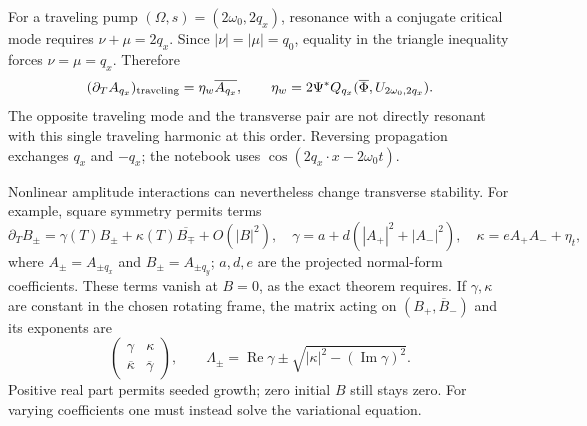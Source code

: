 \documentclass[11pt]{article}
\newcommand{\Rea}{\operatorname{Re}}
\newcommand{\Ima}{\operatorname{Im}}
\begin{document}
For a traveling pump $(\Omega,s)=(2\omega_0,2q_x)$, resonance with a conjugate
critical mode requires $\nu+\mu=2q_x$. Since $|\nu|=|\mu|=q_0$, equality in
the triangle inequality forces $\nu=\mu=q_x$. Therefore
\begin{equation}
 (\partial_T A_{q_x})_{\rm traveling}
 =\eta_w\overline{A_{q_x}},\qquad
 \eta_w=2\Psi^*Q_{q_x}(\overline\Phi,U_{2\omega_0,2q_x}).
\end{equation}
The opposite traveling mode and the transverse pair are not directly resonant
with this single traveling harmonic at this order.
Reversing propagation exchanges $q_x$ and $-q_x$; the notebook uses
$\cos(2q_x\cdot x-2\omega_0t)$.

Nonlinear amplitude interactions can nevertheless change transverse stability.
For example, square symmetry permits terms
\begin{equation}
 \partial_T B_\pm=\gamma(T)B_\pm+\kappa(T)\overline{B_\mp}+O(|B|^2),
 \quad \gamma=a+d(|A_+|^2+|A_-|^2),\quad
 \kappa=eA_+A_-+\eta_t,
\end{equation}
where $A_\pm=A_{\pm q_x}$ and $B_\pm=A_{\pm q_y}$; $a,d,e$ are the
projected normal-form coefficients. These terms vanish at $B=0$, as the exact
theorem requires. If $\gamma,\kappa$ are constant in the chosen rotating frame,
the matrix acting on $(B_+,\overline B_-)$ and its exponents are
\begin{equation}
 \begin{pmatrix}\gamma&\kappa\\\overline\kappa&\overline\gamma\end{pmatrix},
 \qquad \Lambda_\pm=\Rea\gamma\pm\sqrt{|\kappa|^2-(\Ima\gamma)^2}.
\end{equation}
Positive real part permits seeded growth; zero initial $B$ still stays zero.
For varying coefficients one must instead solve the variational equation.

\newpage
\end{document}

